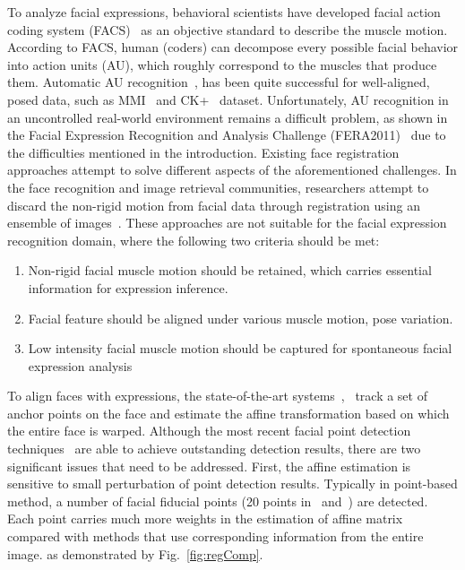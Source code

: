 \documentclass[10pt,journal]{IEEEtran}
\begin{document}
To analyze facial expressions, behavioral scientists have developed facial action coding system (FACS)~\cite{Ekman78} as an objective standard to describe the muscle motion. According to FACS, human (coders) can decompose every possible facial behavior into action units (AU), which roughly correspond to the muscles that produce them. Automatic AU recognition~\cite{Zhao_PAMI07}\cite{Valstar_SMCB12}, has been quite successful for well-aligned, posed data, such as MMI~\cite{Pantic_ICME05} and CK+~\cite{Kanade_FG00} dataset. Unfortunately, AU recognition in an uncontrolled real-world environment remains a difficult problem, as shown in the Facial Expression Recognition and Analysis Challenge (FERA2011)~\cite{Valstar_FERA11} due to the difficulties mentioned in the introduction. Existing face registration approaches attempt to solve different aspects of the aforementioned challenges. In the face recognition and image retrieval communities, researchers attempt to discard the non-rigid motion from facial data through registration using an ensemble of images~\cite{LearnedMiller_PAMI06}\cite{Huang_ICCV07}\cite{Peng_CVPR10}. These approaches are not suitable for the facial expression recognition domain, where the following two criteria should be met:
\begin{enumerate}
\item Non-rigid facial muscle motion should be retained, which carries essential information for expression inference. 
\item Facial feature should be aligned under various muscle motion, pose variation. 
\item Low intensity facial muscle motion should be captured for spontaneous facial expression analysis
\end{enumerate}

To align faces with expressions, the state-of-the-art systems~\cite{Valstar_SMCB12},~\cite{Littlewort_CERT_FG2011} track a set of anchor points on the face and estimate the affine transformation based on which the entire face is warped. Although the most recent facial point detection techniques~\cite{Martinez_PAMI13}\cite{Xiong13}\cite{Zhu_CVPR12} are able to achieve outstanding detection results, there are two significant issues that need to be addressed. First, the affine estimation is sensitive to small perturbation of point detection results. Typically in point-based method, a number of facial fiducial points (20 points in~\cite{Valstar_SMCB12} and~\cite{Martinez_PAMI13}) are detected. Each point carries much more weights in the estimation of affine matrix compared with methods that use corresponding information from the entire image. as demonstrated by Fig.~\ref{fig:regComp}.
\end{document}
